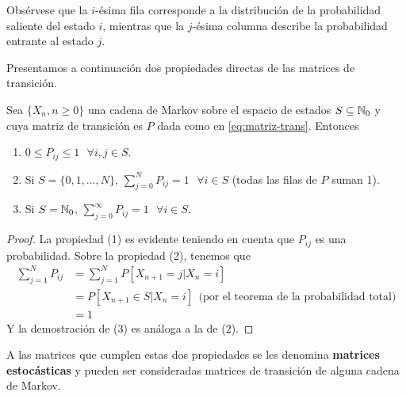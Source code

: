 \begin{observacion}
    Obsérvese que la $i$-ésima fila corresponde a la distribución de la probabilidad saliente del estado $i$, mientras que la $j$-ésima columna describe la probabilidad entrante al estado $j$.
\end{observacion}

Presentamos a continuación dos propiedades directas de las matrices de transición.

\begin{proposicion}
    \label{prop:propiedades-matrices-markov}
Sea $\{X_n, n\geq 0\}$ una cadena de Markov sobre el espacio de estados $S\subseteq \mathbb{N}_0$ y cuya matriz de transición es $P$ dada como en \eqref{eq:matriz-trans}. Entonces
\begin{enumerate}
    \item $0\leq P_{ij} \leq 1 \ \ \ \forall i,j\in S$.
    \item Si $S=\{0,1,\dots,N\}$, $\displaystyle\sum_{j=0}^N P_{ij} = 1 \ \ \ \forall i\in S$ (todas las filas de $P$ suman 1).
    \item Si $S=\mathbb{N}_0$, $\displaystyle\sum_{j=0}^\infty P_{ij} = 1 \ \ \ \forall i\in S$.
\end{enumerate}
\end{proposicion}
\begin{proof}
    La propiedad (1) es evidente teniendo en cuenta que $P_{ij}$ es una probabilidad. Sobre la propiedad (2), tenemos que
    \begin{equation*}
        \begin{split}
            \sum_{j=1}^N P_{ij} &= \sum_{j=1}^N P[X_{n+1}=j|X_n=i] \\
            &= P[X_{n+1}\in S|X_n=i] \ \ \text{(por el teorema de la probabilidad total)} \\
            &= 1
        \end{split}
    \end{equation*}
    Y la demostración de (3) es análoga a la de (2).
\end{proof}

A las matrices que cumplen estas dos propiedades se les denomina \textbf{matrices estocásticas} y pueden ser consideradas matrices de transición de alguna cadena de Markov.

